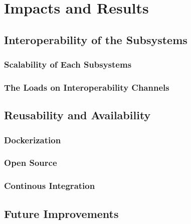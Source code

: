 \chapter{Impacts and Results}

\section{Interoperability of the Subsystems}

\subsection{Scalability of Each Subsystems}

\subsection{The Loads on Interoperability Channels}

\section{Reusability and Availability}

\subsection{Dockerization}

\subsection{Open Source}

\subsection{Continous Integration}

\section{Future Improvements}